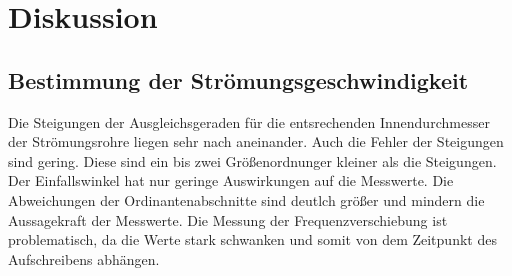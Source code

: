\section{Diskussion}
\label{sec:Diskussion}
\subsection{Bestimmung der Strömungsgeschwindigkeit}
Die Steigungen der Ausgleichsgeraden für die entsrechenden Innendurchmesser der Strömungsrohre liegen sehr nach aneinander.
Auch die Fehler der Steigungen sind gering.
Diese sind ein bis zwei Größenordnunger kleiner als die Steigungen.
Der Einfallswinkel hat nur geringe Auswirkungen auf die Messwerte.
Die Abweichungen der Ordinantenabschnitte sind deutlch größer und mindern die Aussagekraft der Messwerte.
Die Messung der Frequenzverschiebung ist problematisch, da die Werte stark schwanken und somit von dem Zeitpunkt des Aufschreibens abhängen.
